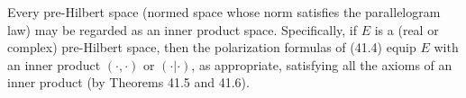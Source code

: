 Every pre-Hilbert space (normed space whose norm satisfies the parallelogram law) may be regarded as an inner product space. Specifically, if $E$ is a (real or complex) pre-Hilbert space, then the polarization formulas of (41.4) equip $E$ with an inner product $(\cdot,\cdot)$ or $(\cdot|\cdot)$, as appropriate, satisfying all the axioms of an inner product (by Theorems 41.5 and 41.6).
